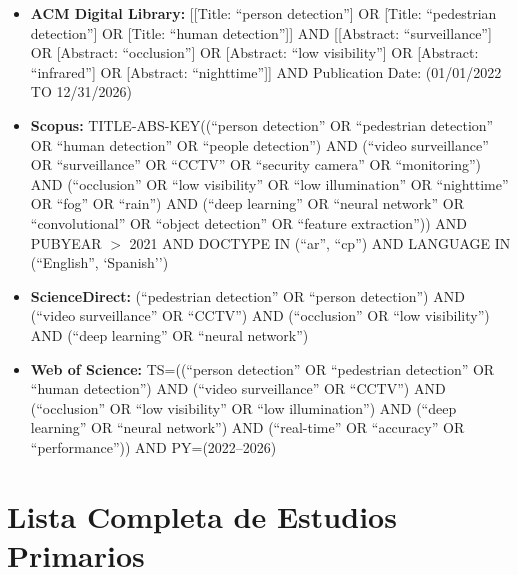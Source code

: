 \documentclass[12pt, a4paper]{article}
\begin{document}
\begin{itemize}
  \item \textbf{ACM Digital Library:}
        [[Title: ``person detection''] OR [Title: ``pedestrian
        detection''] OR [Title: ``human detection'']] AND
        [[Abstract: ``surveillance''] OR [Abstract: ``occlusion''] OR
        [Abstract: ``low visibility''] OR [Abstract: ``infrared''] OR
        [Abstract: ``nighttime'']] AND Publication Date:
        (01/01/2022 TO 12/31/2026)
  \item \textbf{Scopus:} TITLE-ABS-KEY((``person detection'' OR
        ``pedestrian detection'' OR ``human detection'' OR ``people
        detection'') AND (``video surveillance'' OR ``surveillance'' OR
        ``CCTV'' OR ``security camera'' OR ``monitoring'') AND
        (``occlusion'' OR ``low visibility'' OR ``low illumination'' OR
        ``nighttime'' OR ``fog'' OR ``rain'') AND (``deep learning'' OR
        ``neural network'' OR ``convolutional'' OR ``object detection''
        OR ``feature extraction'')) AND PUBYEAR $>$ 2021 AND DOCTYPE
        IN (``ar'', ``cp'') AND LANGUAGE IN (``English'',
        `Spanish'')
  \item \textbf{ScienceDirect:} (``pedestrian detection'' OR ``person
        detection'') AND (``video surveillance'' OR ``CCTV'') AND
        (``occlusion'' OR ``low visibility'') AND (``deep learning'' OR
        ``neural network'')
  \item \textbf{Web of Science:} TS=((``person detection'' OR
        ``pedestrian detection'' OR ``human detection'') AND
        (``video surveillance'' OR ``CCTV'') AND (``occlusion'' OR
        ``low visibility'' OR ``low illumination'') AND (``deep
        learning'' OR ``neural network'') AND (``real-time'' OR
        ``accuracy'' OR ``performance'')) AND PY=(2022--2026)
\end{itemize}

\section{Lista Completa de Estudios Primarios}
\end{document}
